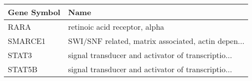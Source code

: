 \begin{tabular}{ll}
\toprule
Gene Symbol &                                               Name \\
\midrule
       RARA &                      retinoic acid receptor, alpha \\
    SMARCE1 & SWI/SNF related, matrix associated, actin depen... \\
      STAT3 & signal transducer and activator of transcriptio... \\
     STAT5B & signal transducer and activator of transcriptio... \\
\bottomrule
\end{tabular}
